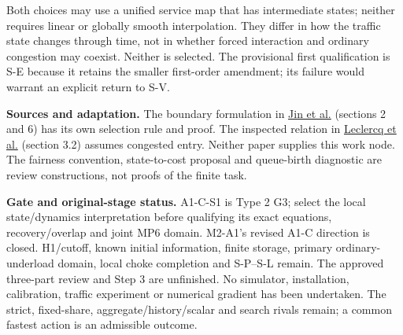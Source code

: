 \documentclass[11pt,a4paper]{article}
\begin{document}
Both choices may use a unified service map that has intermediate states;
neither requires linear or globally smooth interpolation. They differ
in how the traffic state changes through time, not in whether forced
interaction and ordinary congestion may coexist. Neither is selected.
The provisional first qualification is S-E because it retains the smaller
first-order amendment; its failure would warrant an explicit return to S-V.

\textbf{Sources and adaptation.} The boundary formulation in
\href{https://arxiv.org/pdf/1310.2660}{Jin et al.} (sections 2 and 6) has
its own selection rule and proof. The inspected relation in
\href{https://repository.tudelft.nl/file/File_c424c1b3-7374-436b-a6a7-abdf69063aa6}{Leclercq et al.}
(section 3.2) assumes congested entry. Neither paper supplies this work
node. The fairness convention, state-to-cost proposal and queue-birth
diagnostic are review constructions, not proofs of the finite task.

\textbf{Gate and original-stage status.} A1-C-S1 is Type 2 G3; select the
local state/dynamics interpretation before qualifying its exact equations,
recovery/overlap and joint MP6 domain. M2-A1's revised A1-C direction is
closed. H1/cutoff, known initial information, finite storage, primary
ordinary-underload domain, local choke completion and S-P--S-L remain.
The approved three-part review and Step 3 are unfinished. No simulator,
installation, calibration, traffic experiment or numerical gradient has
been undertaken. The strict, fixed-share, aggregate/history/scalar and
search rivals remain; a common fastest action is an admissible outcome.
\end{document}
